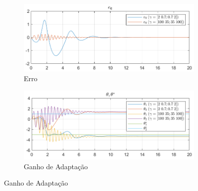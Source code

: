 \documentclass[10pt]{article}
\begin{document}
\begin{figure}[h!]
    \centering
    \begin{subfigure}[b]{0.45\textwidth}
        \centering
        \includegraphics[width=\textwidth]{img/fig09a.png}
        \caption{Erro}
    \end{subfigure}
    \begin{subfigure}[b]{0.45\textwidth}
        \centering
        \includegraphics[width=\textwidth]{img/fig09b.png}
        \caption{Ganho de Adaptação}
    \end{subfigure}

    \vspace{0.5cm}


\end{figure}
\end{document}
